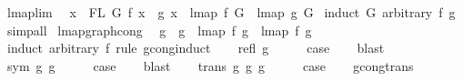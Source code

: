 \begin{isabellebody}
\ lmap{\isacharunderscore}{\kern0pt}lim{\isacharcolon}{\kern0pt}\isanewline
\ \ {\isachardoublequoteopen}{\isasymforall}x\ {\isasymin}\ FL\ G{\isachardot}{\kern0pt}\ f\ x\ {\isacharequal}{\kern0pt}\ g\ x\ {\isacharequal}{\kern0pt}{\isacharequal}{\kern0pt}{\isachargreater}{\kern0pt}\ lmap\ f\ G\ {\isacharequal}{\kern0pt}\ lmap\ g\ G{\isachardoublequoteclose}\isanewline
%
\isadelimproof
%
\endisadelimproof
%
\isatagproof
{}\isamarkupfalse%
\ {\isacharparenleft}{\kern0pt}induct\ G\ arbitrary{\isacharcolon}{\kern0pt}\ f\ g{\isacharparenright}{\kern0pt}\isanewline
{}\isamarkupfalse%
\ simp{\isacharunderscore}{\kern0pt}all%
\endisatagproof
{\isafoldproof}%
%
\isadelimproof
\isanewline
%
\endisadelimproof
\isanewline
\isanewline
{}\isamarkupfalse%
\ lmap{\isacharunderscore}{\kern0pt}graph{\isacharunderscore}{\kern0pt}cong{\isacharcolon}{\kern0pt}\isanewline
\ \ {\isachardoublequoteopen}g{}\ {\isasymsimeq}\ g{}\ {\isacharequal}{\kern0pt}{\isacharequal}{\kern0pt}{\isachargreater}{\kern0pt}\ lmap\ f\ g{}\ {\isasymsimeq}\ lmap\ f\ g{}{\isachardoublequoteclose}\isanewline
%
\isadelimproof
%
\endisadelimproof
%
\isatagproof
{}\isamarkupfalse%
\ {\isacharparenleft}{\kern0pt}induct\ arbitrary{\isacharcolon}{\kern0pt}\ f\ rule{\isacharcolon}{\kern0pt}\ gcong{\isachardot}{\kern0pt}induct{\isacharparenright}{\kern0pt}\isanewline
\ \ \isamarkupfalse%
\ {\isacharparenleft}{\kern0pt}refl\ g{\isacharparenright}{\kern0pt}\isanewline
\ \ \isamarkupfalse%
\ \isamarkupfalse%
\ {\isacharquery}{\kern0pt}case\isanewline
\ \ \isamarkupfalse%
\ blast\isanewline
{}\isamarkupfalse%
\isanewline
\ \ \isamarkupfalse%
\ {\isacharparenleft}{\kern0pt}sym\ g{}\ g{}{\isacharparenright}{\kern0pt}\isanewline
\ \ \isamarkupfalse%
\ \isamarkupfalse%
\ {\isacharquery}{\kern0pt}case\isanewline
\ \ \isamarkupfalse%
\ blast\isanewline
{}\isamarkupfalse%
\isanewline
\ \ \isamarkupfalse%
\ {\isacharparenleft}{\kern0pt}trans\ g{}\ g{}\ g{}{\isacharparenright}{\kern0pt}\isanewline
\ \ \isamarkupfalse%
\ \isamarkupfalse%
\ {\isacharquery}{\kern0pt}case\isanewline
\ \ \isamarkupfalse%
\ gcong{\isachardot}{\kern0pt}trans\ \isamarkupfalse%

\end{isabellebody}
